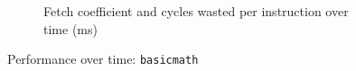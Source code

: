 \documentclass[../bachelor_paper.tex]{subfiles}
\begin{document}
\begin{figure}
\begin{subfigure}{0.45\textwidth}
        \caption{Fetch coefficient and cycles wasted per instruction over time (ms)}
    \end{subfigure}
    \caption{Performance over time: \texttt{basicmath}}
\end{figure}

\isstandalone



\fi
\end{document}
